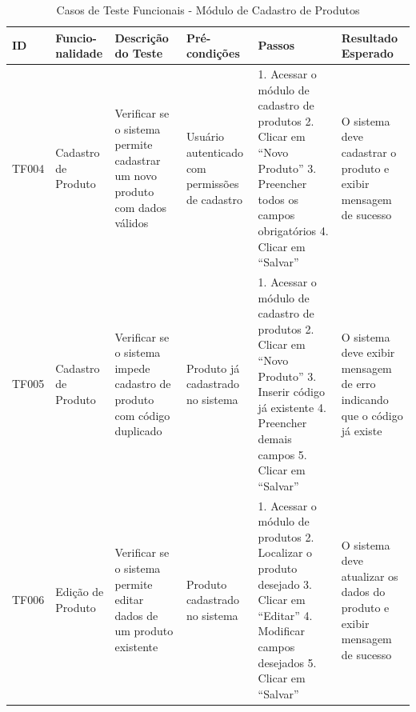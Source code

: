 \documentclass[
	12pt,				%
	openany,			%
	twoside,			%
	a4paper,			%
	english,			%
	brazil				%
	]{abntex2}
\begin{document}
\begin{table}[htbp]

\caption{Casos de Teste Funcionais - Módulo de Cadastro de Produtos}
\begin{tabular}{|p{1cm}|p{1.7cm}|p{3.2cm}|p{2.1cm}|p{3.5cm}|p{3.5cm}|}
\hline
\textbf{ID} & \textbf{Funcio-nalidade} & \textbf{Descrição do Teste} & \textbf{Pré-condições} & \textbf{Passos} & \textbf{Resultado Esperado} \\
\hline
TF004 & Cadastro de Produto & Verificar se o sistema permite cadastrar um novo produto com dados válidos & Usuário autenticado com permissões de cadastro & 
1. Acessar o módulo de cadastro de produtos
2. Clicar em ``Novo Produto''
3. Preencher todos os campos obrigatórios
4. Clicar em ``Salvar'' & 
O sistema deve cadastrar o produto e exibir mensagem de sucesso \\
\hline
TF005 & Cadastro de Produto & Verificar se o sistema impede cadastro de produto com código duplicado & Produto já cadastrado no sistema & 
1. Acessar o módulo de cadastro de produtos
2. Clicar em ``Novo Produto''
3. Inserir código já existente
4. Preencher demais campos
5. Clicar em ``Salvar'' & 
O sistema deve exibir mensagem de erro indicando que o código já existe \\
\hline
TF006 & Edição de Produto & Verificar se o sistema permite editar dados de um produto existente & Produto cadastrado no sistema & 
1. Acessar o módulo de produtos
2. Localizar o produto desejado
3. Clicar em ``Editar''
4. Modificar campos desejados
5. Clicar em ``Salvar'' & 
O sistema deve atualizar os dados do produto e exibir mensagem de sucesso \\
\hline
\end{tabular}
\end{table}

\FloatBarrier
\end{document}
